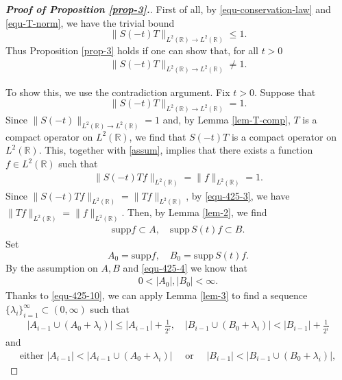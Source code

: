 \documentclass[12pt]{amsart}
\def\R {\mathbb{R}}
\theoremstyle{definition}
\numberwithin{equation}{section}
\begin{document}
\begin{proof}[\bf \textit{Proof of Proposition \ref{prop-3}}.] %
First of all, by \eqref{equ-conservation-law} and \eqref{equ-T-norm}, we have the trivial bound
$$
\|S(-t)T\|_{L^2(\R)\to L^2(\R)}\leq 1.
$$
Thus Proposition \ref{prop-3} holds if one can show that, for all $t>0$
\begin{align}\label{equ-4-23-1}
\|S(-t)T\|_{L^2(\R)\to L^2(\R)}\neq 1.
\end{align}


To show this, we use the contradiction argument. Fix $t>0$. Suppose that
\begin{equation}\label{assum}
    \|S(-t) T \|_{L^2(\R)\to L^2(\R)}=1.
\end{equation}
Since $\|S(-t)\|_{L^2(\R)\to L^2(\R)}=1$ and, by Lemma \ref{lem-T-comp}, $T$ is a compact operator on $L^2(\R)$, we find that $S(-t)T$ is a compact operator on  $L^2(\R)$. This, together with \eqref{assum}, implies that there exists a function $f\in L^2(\R)$ such that
\begin{align}\label{equ-425-3}
\|S(-t)Tf\|_{L^2(\R)}=\|f\|_{L^2(\R)}=1.
\end{align}
Since $\|S(-t)Tf\|_{L^2(\R)}=\|Tf\|_{L^2(\R)}$, by \eqref{equ-425-3}, we have $\|Tf\|_{L^2(\R)}=\|f\|_{L^2(\R)}$. Then, by Lemma \ref{lem-2}, we find
\begin{align}\label{equ-425-4}
\mathrm{supp } f\subset A, \quad \mathrm{supp }\,  S(t)f\subset B.
\end{align}
Set
$$
A_0=\mathrm{supp } f, \quad B_0=\mathrm{supp }\,  S(t)f.
$$
By the assumption on $A,B$ and \eqref{equ-425-4} we know that
\begin{align}\label{equ-425-10}
0<|A_0|, |B_0|<\infty.
\end{align}
Thanks to \eqref{equ-425-10}, we can apply Lemma \ref{lem-3} to find a sequence $\{\lambda_i\}_{i=1}^\infty\subset(0,\infty)$ such that
\begin{align}\label{equ-425-5}
|A_{i-1}\cup (A_0+\lambda_i)|\leq |A_{i-1}|+\frac{1}{2^i}, \quad   |B_{i-1}\cup (B_0+\lambda_i)|<|B_{i-1}|+\frac{1}{2^i}
\end{align}
and
\begin{align}\label{equ-425-6}
\mbox{either } |A_{i-1}|< |A_{i-1}\cup (A_0+\lambda_i)|  \quad  \mbox{ or } \quad |B_{i-1}|< |B_{i-1}\cup (B_0+\lambda_i)|,

\end{align}
\end{proof}
\end{document}

